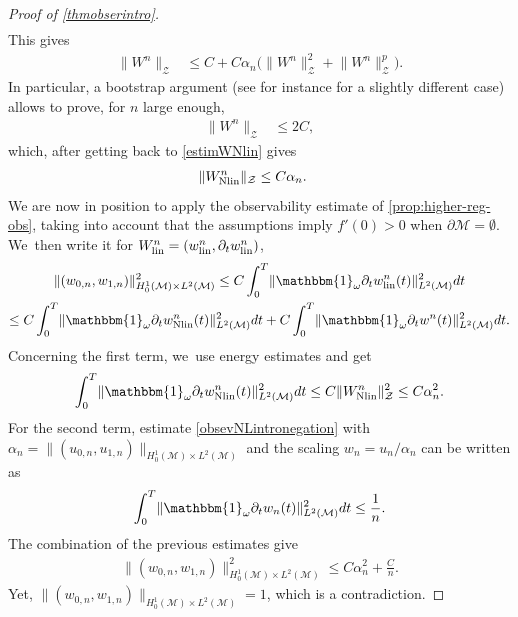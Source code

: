 \documentclass[10pt]{amsart}
\newcommand{\lin}{\textup{lin}}
\newcommand{\Nlin}{\textup{Nlin}}
\theoremstyle{definition}
\let\mc\mathcal
\newcommand{\M}{\mc{M}}
\providecommand{\norm}[1]{\lVert#1\rVert}
\begin{document}
\begin{proof}[Proof of \cref{thmobserintro}]
\begin{align}
\end{align}
This gives
\begin{align*}
\norm{W^n}_{\mc{Z}}&\leq C+ C\alpha_n\bigl( \norm{W^n}_{\mc{Z}}^2+ \norm{W^n}_{\mc{Z}}^p\bigr).
\end{align*}
In particular, a bootstrap argument (see for instance \cite[Lem.\,2.2.]{BG:99} for a slightly different case) allows to prove, for $n$ large enough,
\begin{align*}
\norm{W^n}_{\mc{Z}}&\leq 2C,
\end{align*}
which, after getting back to \eqref{estimWNlin} gives
\begin{align*}
\norm{W_{\Nlin}^n}_{\mc{Z}}&\leq C\alpha_n .
\end{align*}
We are now in position to apply the observability estimate of \cref{prop:higher-reg-obs}, taking into account that the assumptions imply $f'(0)>0$ when $\partial \M=\emptyset$. We~then write it for $W^n_{\lin}=(w^n_{\lin},\partial_tw_{\lin}^n)$,\vspace*{-10pt}
\begin{multline*}
\norm{(w_{0,n},w_{1,n})}_{H_0^1(\M)\times L^2(\M)}^2\leq C \int_0^T \norm{\mathbbm{1}_\omega\partial_t w^{n}_{\lin}(t)}_{L^2(\M)}^2 dt\\
\leq C \int_0^T \norm{\mathbbm{1}_\omega\partial_t w^{n}_{\Nlin}(t)}_{L^2(\M)}^2 dt+ C \int_0^T \norm{\mathbbm{1}_\omega\partial_t w^{n}(t)}_{L^2(\M)}^2 dt.
\end{multline*}
Concerning the first term, we~use energy estimates and get\vspace*{-3pt}
\begin{align*}
\int_0^T \norm{\mathbbm{1}_\omega\partial_t w^{n}_{\Nlin}(t)}_{L^2(\M)}^2 dt\leq C\norm{W_{\Nlin}^n}_{\mc{Z}}^2\leq C\alpha_n^2.
\end{align*}
For the second term, estimate \eqref{obsevNLintronegation} with $\alpha_n=\norm{(u_{0,n},u_{1,n})}_{H_0^1(\M)\times L^2(\M)}$ and the scaling $w_n=u_n/\alpha_n$ can be written as\vspace*{-3pt}
\begin{align*}
\int_0^T \norm{\mathbbm{1}_\omega\partial_t w_{n}(t)}_{L^2(\M)}^2 dt
\leq \frac{1}{n}. \end{align*}
The combination of the previous estimates give\vspace*{-3pt}
\begin{align*}
\norm{(w_{0,n},w_{1,n})}_{H_0^1(\M)\times L^2(\M)}^2\leq C\alpha_n^2+\frac{C}{n}.
\end{align*}
Yet, $\norm{(w_{0,n},w_{1,n})}_{H_0^1(\M)\times L^2(\M)}=1$, which is a contradiction.
\end{proof}
\end{document}

